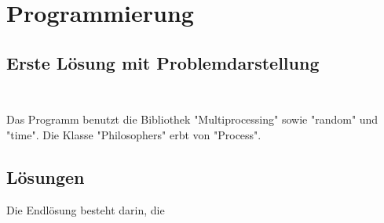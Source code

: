 \chapter{Programmierung}
\label{programmierung}

\section{Erste Lösung mit Problemdarstellung}
\label{erste_lösung}


\begin{lstlisting}[style = Python, label = {erste Lösung}, caption = {erste "naive" Lösung}]


\end{lstlisting}

Das Programm benutzt die Bibliothek "Multiprocessing" sowie "random" und "time". Die Klasse "Philosophers" erbt von "Process". 

\section{Lösungen}
\label{endlösung}

Die Endlösung besteht darin, die  









